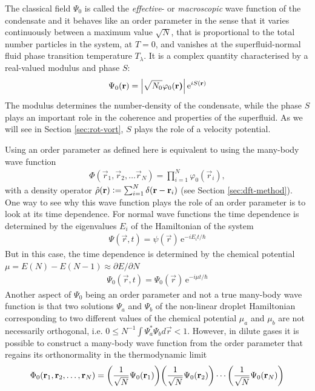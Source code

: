 			The classical field $\Psi_0$ is called the \emph{effective}- or \emph{macroscopic} wave function of the condensate and it behaves like an order parameter in the sense that it varies continuously between a maximum value $\sqrt{N}$, that is proportional to the total number particles in the system, at $T=0$, and vanishes at the superfluid-normal fluid phase transition temperature $T_\lambda$. It is a complex quantity characterised by a real-valued modulus and phase $S$:
			\begin{align}
				\Psi_0(\vec{r}) = \absolutevalue{\sqrt{N_0}\varphi_0(\vec{r)}}\,\mathrm{e}^{iS(\vec{r})}\label{eq:order-param-complex}
			\end{align}
			The modulus determines the number-density of the condensate, while the phase $S$ plays an important role in the coherence and properties of the superfluid. As we will see in Section \ref{sec:rot-vort}, $S$ plays the role of a velocity potential.
			
			Using an order parameter as defined here is equivalent to using the many-body wave function
			\begin{align}
				\Phi(\vec{r}_1,\vec{r}_2,\ldots\vec{r}_N)=\prod_{i=1}^{N}\varphi_0(\vec{r}_i),
			\end{align}
			with a density operator $\hat{\rho}(\vec{r}) \vcentcolon= \sum_{i=1}^{N}\delta(\vec{r}-\vec{r}_i)$ (see Section \ref{sec:dft-method}). One way to see why this wave function plays the role of an order parameter is to look at its time dependence. For normal wave functions the time dependence is determined by the eigenvalues $E_i$ of the Hamiltonian of the system
			\begin{align}
				\Psi(\vec{r},t)=\psi(\vec{r})\,\mathrm{e}^{-iE_it/\hbar}
			\end{align}
			But in this case, the time dependence is determined by the chemical potential $\mu=E(N)-E(N-1)\approx \partial E/\partial N$
			\begin{align}
				\Psi_0(\vec{r},t)=\Psi_0(\vec{r})\,\mathrm{e}^{-i\mu t/\hbar} \label{eq:td-order-param}
			\end{align}
			Another aspect of $\Psi_0$ being an order parameter and not a true many-body wave function is that two solutions $\Psi_a$ and $\Psi_b$ of the non-linear droplet Hamiltonian corresponding to two different values of the chemical potential $\mu_a$ and $\mu_b$ are not necessarily orthogonal, i.e. $0 \leq N^{-1}\int\!\Psi_a^*\Psi_b\unit{d}\vec{r} < 1$. However, in dilute gases it is possible to construct a many-body wave function from the order parameter that regains its orthonormality in the thermodynamic limit
			\begin{align}
				\Phi_0(\vec{r}_1,\vec{r}_2,\ldots,\vec{r}_N) = \qty(\frac{1}{\sqrt{N}}\Psi_0(\vec{r}_1))\qty(\frac{1}{\sqrt{N}}\Psi_0(\vec{r}_2))\cdots\qty(\frac{1}{\sqrt{N}}\Psi_0(\vec{r}_N))
			\end{align}
			
